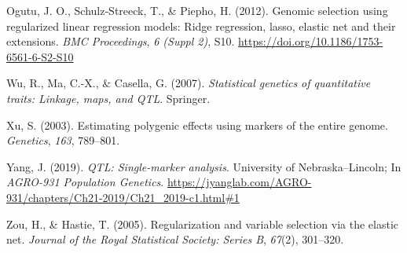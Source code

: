 \documentclass[
  letterpaper,
  DIV=11,
  numbers=noendperiod]{scrartcl}
\newlength{\cslhangindent}
\newenvironment{CSLReferences}[2] %
 {\begin{list}{}{%
  \setlength{\itemindent}{0pt}
  \setlength{\leftmargin}{0pt}
  \setlength{\parsep}{0pt}
  \ifodd #1
   \setlength{\leftmargin}{\cslhangindent}
   \setlength{\itemindent}{-1\cslhangindent}
  \fi
  \setlength{\itemsep}{#2\baselineskip}}}
 {\end{list}}
\begin{document}
\begin{CSLReferences}{1}{0}
Ogutu, J. O., Schulz‐Streeck, T., \& Piepho, H. (2012). Genomic
selection using regularized linear regression models: Ridge regression,
lasso, elastic net and their extensions. \emph{BMC Proceedings}, \emph{6
(Suppl 2)}, S10. \url{https://doi.org/10.1186/1753-6561-6-S2-S10}

Wu, R., Ma, C.-X., \& Casella, G. (2007). \emph{Statistical genetics of
quantitative traits: Linkage, maps, and QTL}. Springer.

Xu, S. (2003). Estimating polygenic effects using markers of the entire
genome. \emph{Genetics}, \emph{163}, 789--801.

Yang, J. (2019). \emph{QTL: Single-marker analysis}. University of
Nebraska--Lincoln; In \emph{AGRO-931 Population Genetics}.
\url{https://jyanglab.com/AGRO-931/chapters/Ch21-2019/Ch21_2019-c1.html\#1}

Zou, H., \& Hastie, T. (2005). Regularization and variable selection via
the elastic net. \emph{Journal of the Royal Statistical Society: Series
B}, \emph{67}(2), 301--320.

\end{CSLReferences}
\end{document}
